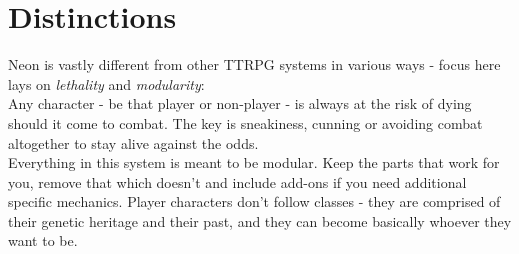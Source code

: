 \documentclass[12pt,a4paper,openany]{book}
\begin{document}
	

	\chapter{Distinctions}
	Neon is vastly different from other TTRPG systems in various ways - focus here lays on \emph{lethality} and \emph{modularity}:\\
	Any character - be that player or non-player - is always at the risk of dying should it come to combat. The key is sneakiness, cunning or avoiding combat altogether to stay alive against the odds.\\
	Everything in this system is meant to be modular. Keep the parts that work for you, remove that which doesn't and include add-ons if you need additional specific mechanics. Player characters don't follow classes - they are comprised of their genetic heritage and their past, and they can become basically whoever they want to be.
\end{document}
